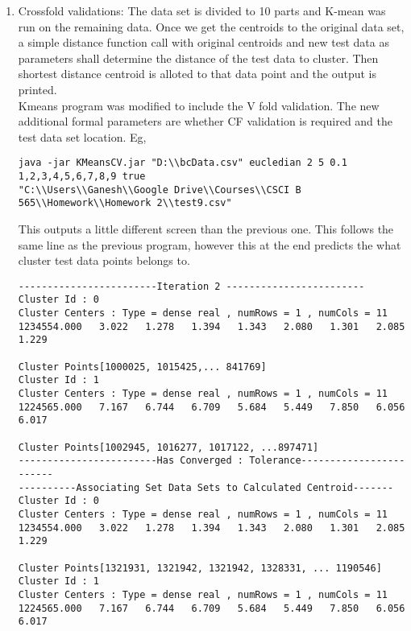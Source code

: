 \documentclass{article}
\begin{document}
\begin{enumerate}
\item Crossfold validations: The data set is divided to 10 parts and K-mean was run on the remaining data. Once we get the centroids to the original data set, a simple distance function call with original centroids and new test data as parameters shall determine the distance of the test data to cluster. Then shortest distance centroid is alloted to that data point and the output is printed. \\
Kmeans program was modified to include the V fold validation. The new additional formal parameters are whether CF validation is required and the test data set location. Eg,
\begin{verbatim}
java -jar KMeansCV.jar "D:\\bcData.csv" eucledian 2 5 0.1 1,2,3,4,5,6,7,8,9 true 
"C:\\Users\\Ganesh\\Google Drive\\Courses\\CSCI B 565\\Homework\\Homework 2\\test9.csv"
\end{verbatim}
This outputs a little different screen than the previous one. This follows the same line as the previous program, however this at the end predicts the what cluster test data points belongs to.
\begin{verbatim}
------------------------Iteration 2 ------------------------
Cluster Id : 0
Cluster Centers : Type = dense real , numRows = 1 , numCols = 11
1234554.000   3.022   1.278   1.394   1.343   2.080   1.301   2.085   1.229  

Cluster Points[1000025, 1015425,... 841769]
Cluster Id : 1
Cluster Centers : Type = dense real , numRows = 1 , numCols = 11
1224565.000   7.167   6.744   6.709   5.684   5.449   7.850   6.056   6.017  

Cluster Points[1002945, 1016277, 1017122, ...897471]
------------------------Has Converged : Tolerance------------------------
----------Associating Set Data Sets to Calculated Centroid-------
Cluster Id : 0
Cluster Centers : Type = dense real , numRows = 1 , numCols = 11
1234554.000   3.022   1.278   1.394   1.343   2.080   1.301   2.085   1.229  

Cluster Points[1321931, 1321942, 1321942, 1328331, ... 1190546]
Cluster Id : 1
Cluster Centers : Type = dense real , numRows = 1 , numCols = 11
1224565.000   7.167   6.744   6.709   5.684   5.449   7.850   6.056   6.017  


\end{verbatim}
\end{enumerate}
\end{document}
